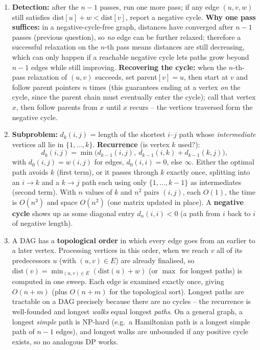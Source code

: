 \documentclass[11pt]{article}
\begin{document}
\begin{enumerate}[label=\textbf{A\arabic*.}, leftmargin=2.2em]
\item \textbf{Detection:} after the $n-1$ passes, run one more pass; if any edge $(u,v,w)$
still satisfies $\mathrm{dist}[u] + w < \mathrm{dist}[v]$, report a negative cycle.
\textbf{Why one pass suffices:} in a negative-cycle-free graph, distances have converged
after $n-1$ passes (previous question), so \emph{no} edge can be further relaxed; therefore
a successful relaxation on the $n$-th pass means distances are still decreasing, which can
only happen if a reachable negative cycle lets paths grow beyond $n-1$ edges while still
improving. \textbf{Recovering the cycle:} when the $n$-th-pass relaxation of $(u,v)$
succeeds, set $\mathrm{parent}[v] = u$, then start at $v$ and follow parent pointers $n$
times (this guarantees ending at a vertex \emph{on} the cycle, since the parent chain must
eventually enter the cycle); call that vertex $x$, then follow parents from $x$ until $x$
recurs -- the vertices traversed form the negative cycle.

\item \textbf{Subproblem:} $d_k(i,j)$ = length of the shortest $i$--$j$ path whose
\emph{intermediate} vertices all lie in $\{1,\ldots,k\}$. \textbf{Recurrence} (is vertex
$k$ used?):
\[
d_k(i,j) = \min\big( d_{k-1}(i,j),\ d_{k-1}(i,k) + d_{k-1}(k,j)\big),
\]
with $d_0(i,j) = w(i,j)$ for edges, $d_0(i,i)=0$, else $\infty$. Either the optimal path
avoids $k$ (first term), or it passes through $k$ exactly once, splitting into an $i \to k$
and a $k \to j$ path each using only $\{1,\ldots,k-1\}$ as intermediates (second term). With
$n$ values of $k$ and $n^2$ pairs $(i,j)$, each $O(1)$, the time is $O(n^3)$ and space
$O(n^2)$ (one matrix updated in place). A \textbf{negative cycle} shows up as some diagonal
entry $d_n(i,i) < 0$ (a path from $i$ back to $i$ of negative length).

\item A DAG has a \textbf{topological order} in which every edge goes from an earlier to a
later vertex. Processing vertices in this order, when we reach $v$ all of its predecessors
$u$ (with $(u,v)\in E$) are already finalised, so $\mathrm{dist}(v) = \min_{(u,v)\in E}
(\mathrm{dist}(u) + w)$ (or $\max$ for longest paths) is computed in one sweep. Each edge is
examined exactly once, giving $O(n+m)$ (plus $O(n+m)$ for the topological sort). Longest
paths are tractable on a DAG precisely because there are no cycles -- the recurrence is
well-founded and longest \emph{walks} equal longest \emph{paths}. On a general graph, a
longest \emph{simple} path is NP-hard (e.g.\ a Hamiltonian path is a longest simple path of
$n-1$ edges), and longest walks are unbounded if any positive cycle exists, so no analogous
DP works.


\end{enumerate}
\end{document}
